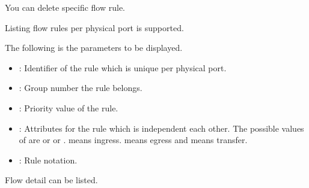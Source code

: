 \documentclass[a4paper,11pt,openany,oneside,english]{sphinxmanual}
\begin{document}
You can delete specific flow rule.

\begin{sphinxVerbatim}[commandchars=\\\{\},formatcom=\footnotesize]
\end{sphinxVerbatim}

Listing flow rules per physical port is supported.

\begin{sphinxVerbatim}[commandchars=\\\{\},formatcom=\footnotesize]
\end{sphinxVerbatim}

The following is the parameters to be displayed.
\begin{itemize}
\item {} 
: Identifier of the rule which is unique per physical port.

\item {} 
: Group number the rule belongs.

\item {} 
: Priority value of the rule.

\item {} 
: Attributes for the rule which is independent each other.
The possible values of  are  or  or .  means
ingress.  means egress and  means transfer.

\item {} 
: Rule notation.

\end{itemize}

Flow detail can be listed.
\end{document}
